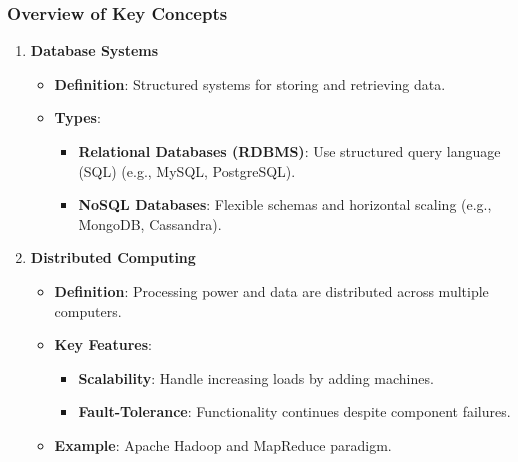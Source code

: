 \documentclass[aspectratio=169]{beamer}
\begin{document}
\begin{frame}[fragile]
    \frametitle{Overview of Key Concepts}
    \begin{enumerate}
        \item \textbf{Database Systems}
        \begin{itemize}
            \item \textbf{Definition}: Structured systems for storing and retrieving data.
            \item \textbf{Types}:
            \begin{itemize}
                \item \textbf{Relational Databases (RDBMS)}: Use structured query language (SQL) (e.g., MySQL, PostgreSQL).
                \item \textbf{NoSQL Databases}: Flexible schemas and horizontal scaling (e.g., MongoDB, Cassandra).
            \end{itemize}
        \end{itemize}

        \item \textbf{Distributed Computing}
        \begin{itemize}
            \item \textbf{Definition}: Processing power and data are distributed across multiple computers.
            \item \textbf{Key Features}:
            \begin{itemize}
                \item \textbf{Scalability}: Handle increasing loads by adding machines.
                \item \textbf{Fault-Tolerance}: Functionality continues despite component failures.
            \end{itemize}
            \item \textbf{Example}: Apache Hadoop and MapReduce paradigm.
        \end{itemize}
    \end{enumerate}
\end{frame}
\end{document}
